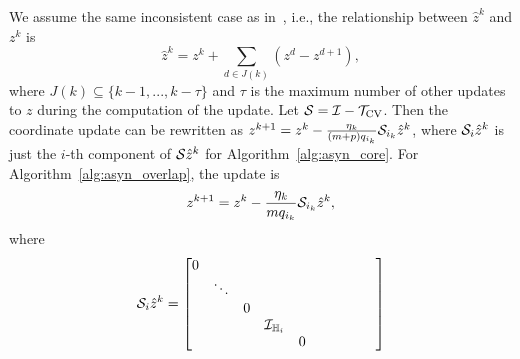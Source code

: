 {%
We assume the same inconsistent case as in~\cite{Peng_2015_AROCK}, i.e., the relationship between $\hat z^k$ and $z^k$ is
\begin{equation}
\hat{z}^k=z^k+\sum_{d\in J(k)}(z^d-z^{d+1}),
\end{equation}
where $J(k)\subseteq \{k-1,...,k-\tau\}$ and $\tau$ is the maximum number of other updates to $z$ during the computation of the update. 
Let $\cS=\cI-\TVC$. %
Then the coordinate update can be rewritten as $z^{k+1}=z^k-\frac{\eta_k}{(m+p)q_{i_k}}\cS_{i_k}\hat{z}^k$, where $\cS_{i}\hat{z}^k$ is just the $i$-th component of $\cS\hat{z}^k$ for Algorithm~\ref{alg:asyn_core}. For Algorithm~\ref{alg:asyn_overlap}, the update is  
\begin{align}\label{eqn:asyn_update_a2}
z^{k+1}=z^k-\frac{\eta_k}{mq_{i_k}}\cS_{i_k}\hat{z}^k,
\end{align} where 
$$\cS_{i}\hat{z}^k=\begin{bmatrix}
0&&&&&&&&&\\
&\ddots&&&&&&&&\\
&&0&&&&&&&\\
&&&\cI_{\HH_i}&&&&&&\\
&&&&0&&&&&\\

\end{bmatrix}$$}

